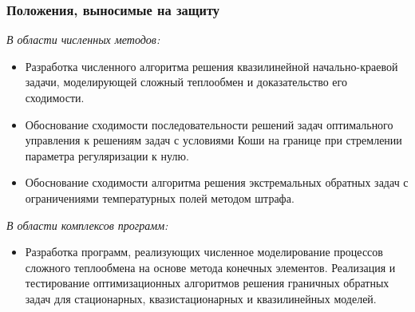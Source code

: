 \begin{frame}
    \frametitle{Положения, выносимые на защиту}
    \textit{В области численных методов:}
    \begin{itemize}
        \item Разработка численного алгоритма решения квазилинейной начально-краевой задачи,
        моделирующей сложный теплообмен и доказательство
        его сходимости.
        \item Обоснование сходимости последовательности решений задач оптимального
        управления к решениям задач с условиями Коши на границе при
        стремлении параметра регуляризации к нулю.
        \item Обоснование сходимости алгоритма решения экстремальных обратных
        задач с ограничениями температурных полей методом штрафа.
    \end{itemize}

    \textit{В области комплексов программ:}
    \begin{itemize}
        \item Разработка программ, реализующих численное моделирование процессов
        сложного теплообмена на основе метода конечных элементов.
        Реализация и тестирование оптимизационных алгоритмов решения
        граничных обратных задач для стационарных, квазистационарных и
        квазилинейных моделей.
    \end{itemize}
\end{frame}

%
%
%
